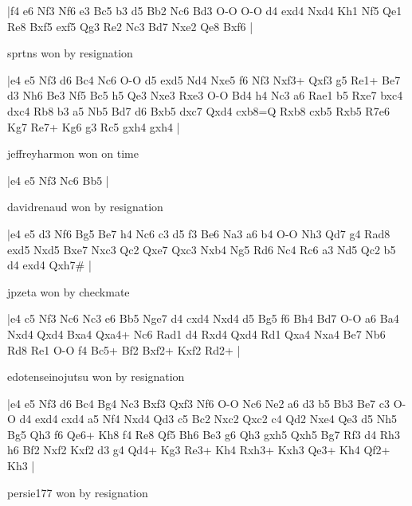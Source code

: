 \makegametitle
|f4 e6 Nf3 Nf6 e3 Bc5 b3 d5 Bb2 Nc6 Bd3 O-O O-O d4 exd4 Nxd4 Kh1 Nf5 Qe1 Re8 Bxf5 exf5 Qg3 Re2 Nc3 Bd7 Nxe2 Qe8 Bxf6  |

\showboard

sprtns won by resignation

\makegametitle
|e4 e5 Nf3 d6 Bc4 Nc6 O-O d5 exd5 Nd4 Nxe5 f6 Nf3 Nxf3+ Qxf3 g5 Re1+ Be7 d3 Nh6 Be3 Nf5 Bc5 h5 Qe3 Nxe3 Rxe3 O-O Bd4 h4 Nc3 a6 Rae1 b5 Rxe7 bxc4 dxc4 Rb8 b3 a5 Nb5 Bd7 d6 Bxb5 dxc7 Qxd4 cxb8=Q Rxb8 cxb5 Rxb5 R7e6 Kg7 Re7+ Kg6 g3 Rc5 gxh4 gxh4  |

\showboard

jeffreyharmon won on time

\makegametitle
|e4 e5 Nf3 Nc6 Bb5  |

\showboard

davidrenaud won by resignation

\makegametitle
|e4 e5 d3 Nf6 Bg5 Be7 h4 Nc6 c3 d5 f3 Be6 Na3 a6 b4 O-O Nh3 Qd7 g4 Rad8 exd5 Nxd5 Bxe7 Nxc3 Qc2 Qxe7 Qxc3 Nxb4 Ng5 Rd6 Nc4 Rc6 a3 Nd5 Qc2 b5 d4 exd4 Qxh7\#  |

\showboard

jpzeta won by checkmate

\makegametitle
|e4 c5 Nf3 Nc6 Nc3 e6 Bb5 Nge7 d4 cxd4 Nxd4 d5 Bg5 f6 Bh4 Bd7 O-O a6 Ba4 Nxd4 Qxd4 Bxa4 Qxa4+ Nc6 Rad1 d4 Rxd4 Qxd4 Rd1 Qxa4 Nxa4 Be7 Nb6 Rd8 Re1 O-O f4 Bc5+ Bf2 Bxf2+ Kxf2 Rd2+  |

\showboard

edotenseinojutsu won by resignation

\makegametitle
|e4 e5 Nf3 d6 Bc4 Bg4 Nc3 Bxf3 Qxf3 Nf6 O-O Nc6 Ne2 a6 d3 b5 Bb3 Be7 c3 O-O d4 exd4 cxd4 a5 Nf4 Nxd4 Qd3 c5 Bc2 Nxc2 Qxc2 c4 Qd2 Nxe4 Qe3 d5 Nh5 Bg5 Qh3 f6 Qe6+ Kh8 f4 Re8 Qf5 Bh6 Be3 g6 Qh3 gxh5 Qxh5 Bg7 Rf3 d4 Rh3 h6 Bf2 Nxf2 Kxf2 d3 g4 Qd4+ Kg3 Re3+ Kh4 Rxh3+ Kxh3 Qe3+ Kh4 Qf2+ Kh3  |

\showboard

persie177 won by resignation


